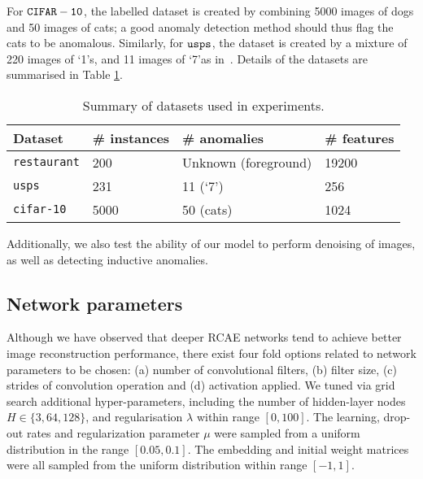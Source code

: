 For $\tt{CIFAR-10}$,
the labelled dataset is created by combining 5000 images of dogs and 50 images of cats;
a good anomaly detection method should thus flag the cats to be anomalous.
Similarly,
for $\tt{usps}$,
the dataset is created by
a mixture of 220 images of \lq1\rq s, and 11 images of \lq7\rq as in~\cite{xu2010robust}.
Details of the datasets are summarised in Table \ref{tbl:datasets}.

\begin{table}[!t]
	\centering
	\renewcommand{\arraystretch}{1.25}
	\setlength{\tabcolsep}{6pt}
	\begin{tabular}{@{}llll@{}}
		\toprule
		\toprule
		Dataset & \# instances & \# anomalies & \# features \\
		\toprule
		{\tt restaurant} & 200 & Unknown (foreground) & 19200 \\
		{\tt usps} 		 & 231 & 11 (\lq7\rq) & 256 \\
		{\tt cifar-10} 	 & 5000 & 50 (cats) & 1024 \\
		\bottomrule
	\end{tabular}
	\caption{Summary of datasets used in experiments.}
	\label{tbl:datasets}
\end{table}

Additionally,
we also test the ability of our model to perform denoising of images,
as well as detecting inductive anomalies.


\subsection{Network parameters}

Although we have observed that deeper RCAE networks tend to achieve better image reconstruction performance, there exist four fold options related to network parameters to be chosen:
(a) number of convolutional filters, (b) filter size, (c) strides of convolution operation and (d) activation applied.
We tuned via grid search additional hyper-parameters, including the number of hidden-layer nodes $H \in \{3, 64, 128\}$, and regularisation $\lambda$ within range ${[0, 100]}$.
The learning, drop-out rates and regularization parameter $\mu$ were sampled from a uniform distribution in the range $[0.05, 0.1]$.
The embedding and initial weight matrices were all sampled from the uniform distribution within range $[-1, 1]$.
